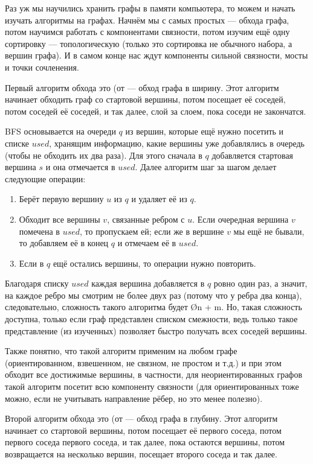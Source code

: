 Раз уж мы научились хранить графы в памяти компьютера, то можем и начать изучать алгоритмы на графах. Начнём мы с самых простых — обхода графа, потом научимся работать с компонентами связности, потом изучим ещё одну сортировку — топологическую (только это сортировка не обычного набора, а вершин графа). И в самом конце нас ждут компоненты сильной связности, мосты и точки сочленения.


Первый алгоритм обхода это  (от  — обход графа в ширину. Этот алгоритм начинает обходить граф со стартовой вершины, потом посещает её соседей, потом соседей её соседей, и так далее, слой за слоем, пока соседи не закончатся. 

BFS основывается на очереди $q$ из вершин, которые ещё нужно посетить и списке $used$, хранящим информацию, какие вершины уже добавлялись в очередь (чтобы не обходить их два раза). Для этого сначала в $q$ добавляется стартовая вершина $s$ и она отмечается в $used$. Далее алгоритм шаг за шагом делает следующие операции:

\begin{enumerate}
    \item Берёт первую вершину $u$ из $q$ и удаляет её из $q$.
    \item Обходит все вершины $v$, связанные ребром с $u$. Если очередная вершина $v$ помечена в $used$, то пропускаем ей; если же в вершине $v$ мы ещё не бывали, то добавляем её в конец $q$ и отмечаем её в $used$.
    \item Если в $q$ ещё остались вершины, то операции нужно повторить.
\end{enumerate}

Благодаря списку $used$ каждая вершина добавляется в $q$ ровно один раз, а значит, на каждое ребро мы смотрим не более двух раз (потому что у ребра два конца), следовательно, сложность такого алгоритма будет \O{n + m}. Но, такая сложность доступна, только если граф представлен списком смежности, ведь только такое представление (из изученных) позволяет быстро получать всех соседей вершины.

Также понятно, что такой алгоритм применим на любом графе (ориентированном, взвешенном, не связном, не простом и т.д.) и при этом обходит все достижимые вершины, в частности, для неориентированных графов такой алгоритм посетит всю компоненту связности (для ориентированных тоже можно, если не учитывать направление рёбер, но это менее полезно).


Второй алгоритм обхода это  (от  — обход графа в глубину. Этот алгоритм начинает со стартовой вершины, потом посещает её первого соседа, потом первого соседа первого соседа, и так далее, пока остаются вершины, потом возвращается на несколько вершин, посещает второго соседа и так далее.

